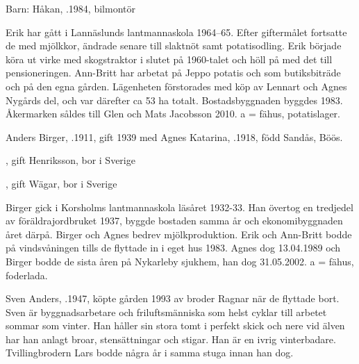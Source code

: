 Barn:  Håkan, .1984,  bilmontör

Erik har gått i Lannäslunds lantmannaskola 1964--65. Efter giftermålet fortsatte de med mjölkkor, ändrade senare till slaktnöt samt potatisodling. Erik började köra ut virke med skogstraktor i slutet på 1960-talet och höll på med det till pensioneringen. Ann-Britt har arbetat på Jeppo potatis och som butiksbiträde och på den egna gården. Lägenheten förstorades med köp av Lennart och Agnes Nygårds del, och var därefter ca 53 ha totalt. Bostadsbyggnaden byggdes 1983. Åkermarken såldes till Glen och Mats Jacobsson 2010. a = fähus, potatislager.






Anders Birger, .1911, gift 1939 med Agnes Katarina, .1918, född Sandås, Böös.
\begin{jhchildren}
  \item {}, gift Henriksson, bor i Sverige
  \item {}, gift Wägar, bor i Sverige
  \item {}
\end{jhchildren}

Birger gick i Korsholms lantmannaskola läsåret 1932-33. Han övertog en tredjedel av föräldrajordbruket 1937, byggde bostaden samma år och ekonomibyggnaden året därpå. Birger och Agnes bedrev mjölkproduktion. Erik och Ann-Britt bodde på vindsvåningen tills de flyttade in i eget hus 1983. Agnes dog 13.04.1989 och Birger bodde de sista åren på Nykarleby sjukhem, han dog 31.05.2002. a = fähus, foderlada.






Sven Anders, .1947,  köpte gården 1993 av broder Ragnar när de flyttade bort. Sven är byggnadsarbetare och friluftsmänniska som helst cyklar till arbetet sommar som vinter. Han håller sin stora tomt i perfekt skick och nere vid älven har han anlagt broar, stensättningar och stigar. Han är en ivrig vinterbadare. Tvillingbrodern Lars bodde några år i samma stuga innan han dog.

